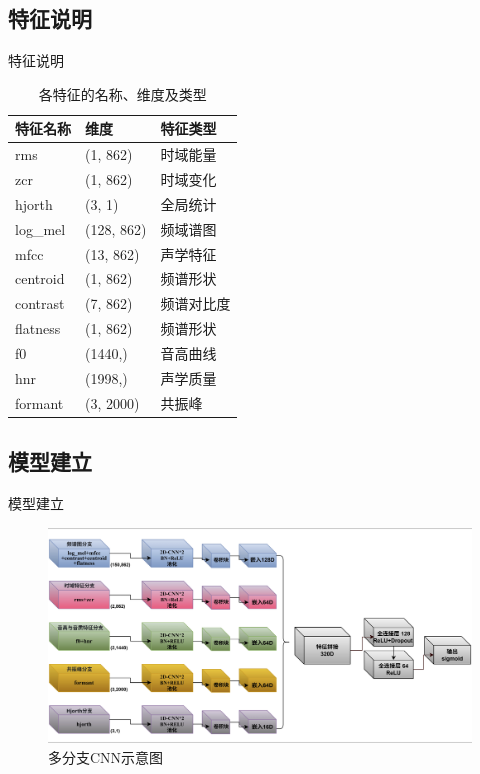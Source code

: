 \documentclass[aspectratio=169]{beamer}
\begin{document}
\subsection{特征说明}
\begin{frame}{特征说明}
\begin{table}
  \centering
  \begin{tabular}{lll}
    \toprule
    特征名称 & 维度 & 特征类型 \\
    \midrule
    rms       & (1, 862)   & 时域能量 \\
    zcr       & (1, 862)   & 时域变化 \\
    hjorth    & (3, 1)     & 全局统计 \\
    log\_mel  & (128, 862) & 频域谱图 \\
    mfcc      & (13, 862)  & 声学特征 \\
    centroid  & (1, 862)   & 频谱形状 \\
    contrast  & (7, 862)   & 频谱对比度 \\
    flatness  & (1, 862)   & 频谱形状 \\
    f0        & (1440,)    & 音高曲线 \\
    hnr       & (1998,)    & 声学质量 \\
    formant   & (3, 2000)  & 共振峰 \\
    \bottomrule
  \end{tabular}
  \caption{各特征的名称、维度及类型}\label{tab:audio-features}
\end{table}
\end{frame}


\subsection{模型建立}
\begin{frame}{模型建立}
  \vspace{0.2cm}
\begin{figure}[h]
    \centering
    \includegraphics[width=0.75\linewidth]{images_in_paper/model.png}
    \caption{多分支CNN示意图}
    \label{fig:model}
\end{figure}

\end{frame}
\end{document}
